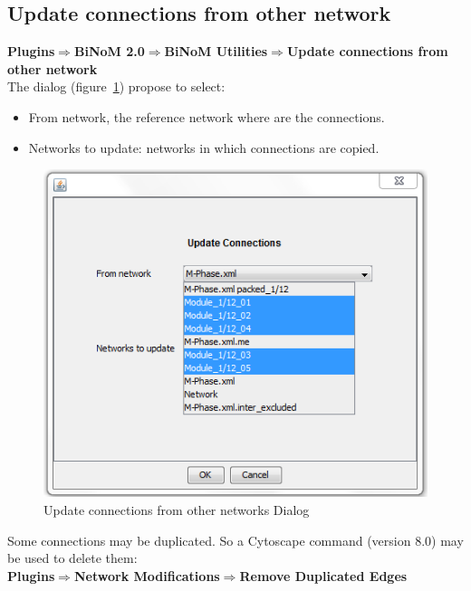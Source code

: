 \subsection{Update connections from other network}
\textbf{Plugins$\Rightarrow$BiNoM 2.0$\Rightarrow$BiNoM Utilities$\Rightarrow$Update connections from other network}\\
The dialog (figure~\ref{Update_connections}) propose to select:
\begin{itemize}
\item From network, the reference network where are the connections.
\item Networks to update: networks in which connections are copied.
\end{itemize}
\begin{figure}[h]
\centering
\includegraphics{graphics/Update_connections}
\caption{Update connections from other networks Dialog}
\label{Update_connections}
\end{figure}
Some connections may be duplicated. So a Cytoscape command (version 8.0) may be used to delete them:\\
\textbf{Plugins$\Rightarrow$Network Modifications$\Rightarrow$Remove Duplicated Edges}

